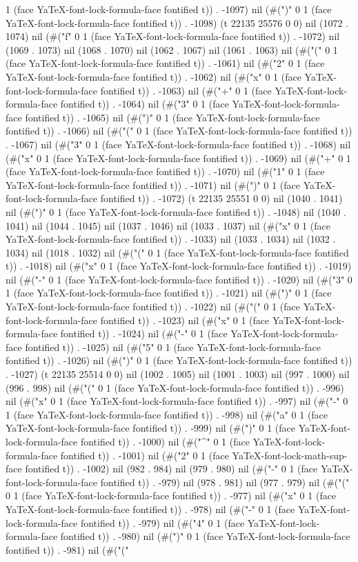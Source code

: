 1 (face YaTeX-font-lock-formula-face fontified t)) . -1097) nil (#(")" 0 1 (face YaTeX-font-lock-formula-face fontified t)) . -1098) (t 22135 25576 0 0) nil (1072 . 1074) nil (#("f" 0 1 (face YaTeX-font-lock-formula-face fontified t)) . -1072) nil (1069 . 1073) nil (1068 . 1070) nil (1062 . 1067) nil (1061 . 1063) nil (#("(" 0 1 (face YaTeX-font-lock-formula-face fontified t)) . -1061) nil (#("2" 0 1 (face YaTeX-font-lock-formula-face fontified t)) . -1062) nil (#("x" 0 1 (face YaTeX-font-lock-formula-face fontified t)) . -1063) nil (#("+" 0 1 (face YaTeX-font-lock-formula-face fontified t)) . -1064) nil (#("3" 0 1 (face YaTeX-font-lock-formula-face fontified t)) . -1065) nil (#(")" 0 1 (face YaTeX-font-lock-formula-face fontified t)) . -1066) nil (#("(" 0 1 (face YaTeX-font-lock-formula-face fontified t)) . -1067) nil (#("3" 0 1 (face YaTeX-font-lock-formula-face fontified t)) . -1068) nil (#("x" 0 1 (face YaTeX-font-lock-formula-face fontified t)) . -1069) nil (#("+" 0 1 (face YaTeX-font-lock-formula-face fontified t)) . -1070) nil (#("1" 0 1 (face YaTeX-font-lock-formula-face fontified t)) . -1071) nil (#(")" 0 1 (face YaTeX-font-lock-formula-face fontified t)) . -1072) (t 22135 25551 0 0) nil (1040 . 1041) nil (#(")" 0 1 (face YaTeX-font-lock-formula-face fontified t)) . -1048) nil (1040 . 1041) nil (1044 . 1045) nil (1037 . 1046) nil (1033 . 1037) nil (#("x" 0 1 (face YaTeX-font-lock-formula-face fontified t)) . -1033) nil (1033 . 1034) nil (1032 . 1034) nil (1018 . 1032) nil (#("(" 0 1 (face YaTeX-font-lock-formula-face fontified t)) . -1018) nil (#("x" 0 1 (face YaTeX-font-lock-formula-face fontified t)) . -1019) nil (#("-" 0 1 (face YaTeX-font-lock-formula-face fontified t)) . -1020) nil (#("3" 0 1 (face YaTeX-font-lock-formula-face fontified t)) . -1021) nil (#(")" 0 1 (face YaTeX-font-lock-formula-face fontified t)) . -1022) nil (#("(" 0 1 (face YaTeX-font-lock-formula-face fontified t)) . -1023) nil (#("x" 0 1 (face YaTeX-font-lock-formula-face fontified t)) . -1024) nil (#("-" 0 1 (face YaTeX-font-lock-formula-face fontified t)) . -1025) nil (#("5" 0 1 (face YaTeX-font-lock-formula-face fontified t)) . -1026) nil (#(")" 0 1 (face YaTeX-font-lock-formula-face fontified t)) . -1027) (t 22135 25514 0 0) nil (1002 . 1005) nil (1001 . 1003) nil (997 . 1000) nil (996 . 998) nil (#("(" 0 1 (face YaTeX-font-lock-formula-face fontified t)) . -996) nil (#("x" 0 1 (face YaTeX-font-lock-formula-face fontified t)) . -997) nil (#("-" 0 1 (face YaTeX-font-lock-formula-face fontified t)) . -998) nil (#("a" 0 1 (face YaTeX-font-lock-formula-face fontified t)) . -999) nil (#(")" 0 1 (face YaTeX-font-lock-formula-face fontified t)) . -1000) nil (#("^" 0 1 (face YaTeX-font-lock-formula-face fontified t)) . -1001) nil (#("2" 0 1 (face YaTeX-font-lock-math-sup-face fontified t)) . -1002) nil (982 . 984) nil (979 . 980) nil (#("-" 0 1 (face YaTeX-font-lock-formula-face fontified t)) . -979) nil (978 . 981) nil (977 . 979) nil (#("(" 0 1 (face YaTeX-font-lock-formula-face fontified t)) . -977) nil (#("x" 0 1 (face YaTeX-font-lock-formula-face fontified t)) . -978) nil (#("-" 0 1 (face YaTeX-font-lock-formula-face fontified t)) . -979) nil (#("4" 0 1 (face YaTeX-font-lock-formula-face fontified t)) . -980) nil (#(")" 0 1 (face YaTeX-font-lock-formula-face fontified t)) . -981) nil (#("(" 